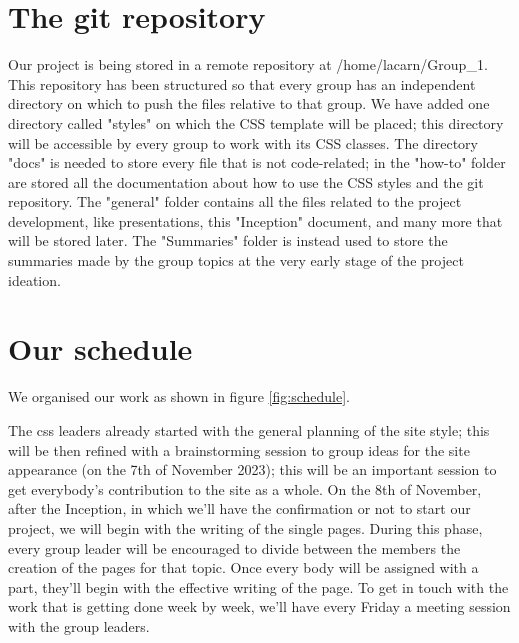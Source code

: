 \documentclass{article}
\begin{document}
    \clearpage
    \section{The git repository}
    Our project is being stored in a remote repository at /home/lacarn/Group\_1.
    This repository has been structured so that every group has an independent directory on which to push the files relative to that group.
    We have added one directory called "styles" on which the CSS template will be placed; this directory will be accessible by every group to work with its CSS classes. 
    The directory "docs" is needed to store every file that is not code-related; in the "how-to" folder are stored all the documentation about how to use the CSS styles and the git repository. 
    The "general" folder contains all the files related to the project development, like presentations, this "Inception" document, and many more that will be stored later. 
    The "Summaries" folder is instead used to store the summaries made by the group topics at the very early stage of the project ideation.
    
    \bigskip
    
    
    \pagebreak
    
    \section{Our schedule}
    We organised our work as shown in figure \ref{fig:schedule}. 
    
    The css leaders already started with the general planning of the site style; this will be then refined with a brainstorming session to group ideas for the site appearance (on the 7th of November 2023); this will be an important session to get everybody's contribution to the site as a whole. On the 8th of November, after the Inception, in which we'll have the confirmation or not to start our project, we will begin with the writing of the single pages. During this phase, every group leader will be encouraged to divide between the members the creation of the pages for that topic. Once every body will be assigned with a part, they'll begin with the effective writing of the page. To get in touch with the work that is getting done week by week, we'll have every Friday a meeting session with the group leaders. 
    
\end{document}
